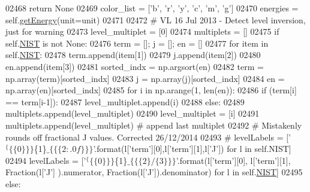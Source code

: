 \begin{DoxyCode}
02468             \textcolor{keywordflow}{return} \textcolor{keywordtype}{None}
02469         color\_list = [\textcolor{stringliteral}{'b'}, \textcolor{stringliteral}{'}\textcolor{stringliteral}{r', '}y', 'c', 'm', 'g']
02470         energies = self.\hyperlink{classpyneb_1_1core_1_1pynebcore_1_1_atom_a9940acb2999e864edf9761d822e65d7f}{getEnergy}(unit=unit)
02471          
02472         \textcolor{comment}{# VL 16 Jul 2013 - Detect level inversion, just for warning        }
02473         level\_multiplet = [0]
02474         multiplets = []
02475         \textcolor{keywordflow}{if} self.\hyperlink{classpyneb_1_1core_1_1pynebcore_1_1_atom_a65e03e79fb1cde1b00580042f3303538}{NIST} \textcolor{keywordflow}{is} \textcolor{keywordflow}{not} \textcolor{keywordtype}{None}:
02476             term = []; j = []; en = []
02477             \textcolor{keywordflow}{for} item \textcolor{keywordflow}{in} self.\hyperlink{classpyneb_1_1core_1_1pynebcore_1_1_atom_a65e03e79fb1cde1b00580042f3303538}{NIST}:
02478                 term.append(item[1])
02479                 j.append(item[2])
02480                 en.append(item[3])
02481             sorted\_indx = np.argsort(en) 
02482             term = np.array(term)[sorted\_indx]
02483             j = np.array(j)[sorted\_indx]
02484             en = np.array(en)[sorted\_indx]
02485             \textcolor{keywordflow}{for} i \textcolor{keywordflow}{in} np.arange(1, len(en)):
02486                 \textcolor{keywordflow}{if} (term[i] == term[i-1]):
02487                     level\_multiplet.append(i)
02488                 \textcolor{keywordflow}{else}:
02489                     multiplets.append(level\_multiplet) 
02490                     level\_multiplet = [i]
02491             multiplets.append(level\_multiplet) \textcolor{comment}{# append last multiplet}
02492 \textcolor{comment}{# Mistakenly rounds off fractional J values. Corrected 26/12/2014            }
02493 \textcolor{comment}{#            levelLabels = ['$^\{\{\{0\}\}\}$\{1\}$\_\{\{\{2:.0f\}\}\}$'.format(l['term'][0],l['term'][1],l['J']) for l in
       self.NIST]}
02494             levelLabels = [\textcolor{stringliteral}{'$^\{\{\{0\}\}\}$\{1\}$\_\{\{\{2\}/\{3\}\}\}$'}.format(l[\textcolor{stringliteral}{'term'}][0], l[\textcolor{stringliteral}{'term'}][1], Fraction(l[\textcolor{stringliteral}{'J'}]
      ).numerator, Fraction(l[\textcolor{stringliteral}{'J'}]).denominator) \textcolor{keywordflow}{for} l \textcolor{keywordflow}{in} self.\hyperlink{classpyneb_1_1core_1_1pynebcore_1_1_atom_a65e03e79fb1cde1b00580042f3303538}{NIST}]
02495         \textcolor{keywordflow}{else}:

\end{DoxyCode}
